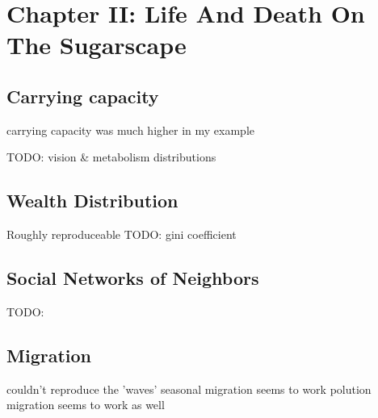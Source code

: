 \section{Chapter II: Life And Death On The Sugarscape}

\subsection{Carrying capacity}
carrying capacity was much higher in my example

TODO: vision & metabolism distributions

\subsection{Wealth Distribution}
Roughly reproduceable
TODO: gini coefficient

\subsection{Social Networks of Neighbors}
TODO: 

\subsection{Migration}
couldn't reproduce the 'waves'
seasonal migration seems to work
polution migration seems to work as well